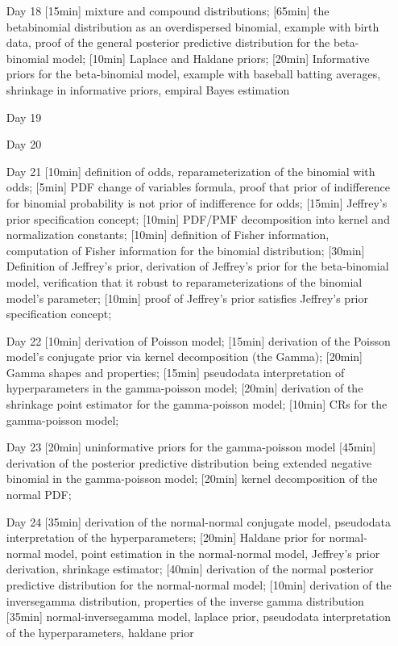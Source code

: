 \begin{enumerate}
\item[Day 18] [15min] mixture and compound distributions;  [65min] the betabinomial distribution as an overdispersed binomial, example with birth data, proof of the general posterior predictive distribution for the beta-binomial model; [10min] Laplace and Haldane priors; [20min] Informative priors for the beta-binomial model, example with baseball batting averages, shrinkage in informative priors, empiral Bayes estimation

\item[Day 19] 
\item[Day 20] 

\item[Day 21]  [10min] definition of odds, reparameterization of the binomial with odds; [5min] PDF change of variables formula, proof that prior of indifference for binomial probability is not prior of indifference for odds; [15min] Jeffrey's prior specification concept; [10min] PDF/PMF decomposition into kernel and normalization constants; [10min] definition of Fisher information, computation of Fisher information for the binomial distribution; [30min] Definition of Jeffrey's prior, derivation of Jeffrey's prior for the beta-binomial model, verification that it robust to reparameterizations of the binomial model's parameter; [10min] proof of Jeffrey's prior satisfies  Jeffrey's prior specification concept;


\item[Day 22] [10min] derivation of Poisson model; [15min] derivation of the Poisson model's conjugate prior via kernel decomposition (the Gamma); [20min] Gamma shapes and properties; [15min] pseudodata interpretation of hyperparameters in the gamma-poisson model; [20min] derivation of the shrinkage point estimator for the gamma-poisson model; [10min] CRs for the gamma-poisson model; 

\item[Day 23] [20min] uninformative priors for the gamma-poisson model [45min] derivation of the posterior predictive distribution being extended negative binomial in the gamma-poisson model; [20min] kernel decomposition of the normal PDF; 

\item[Day 24] [35min] derivation of the normal-normal conjugate model, pseudodata interpretation of the hyperparameters; [20min] Haldane prior for normal-normal model, point estimation in the normal-normal model, Jeffrey's prior derivation, shrinkage estimator; [40min] derivation of the normal posterior predictive distribution for the normal-normal model; [10min] derivation of the inversegamma distribution, properties of the inverse gamma distribution [35min] normal-inversegamma model, laplace prior, pseudodata interpretation of the hyperparameters, haldane prior


\end{enumerate}
